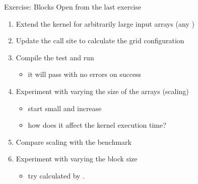 \begin{frame}[fragile]{Exercise: Blocks}
    Open  from the last exercise
    \begin{enumerate}
        \item Extend the \axpy kernel for arbitrarily large input arrays (any )

        \item Update the call site to calculate the grid configuration

        \item Compile the test and run
        \begin{itemize}
            \item it will pass with no errors on success
        \end{itemize}

        \item Experiment with varying the size of the arrays (scaling)
        \begin{itemize}
            \item start small and increase
            \item how does it affect the kernel execution time?
        \end{itemize}

        \item \extra Compare scaling with the  benchmark

        \item \extra Experiment with varying the block size
        \begin{itemize}
            \item try  calculated by .
        \end{itemize}

    \end{enumerate}

\end{frame}

